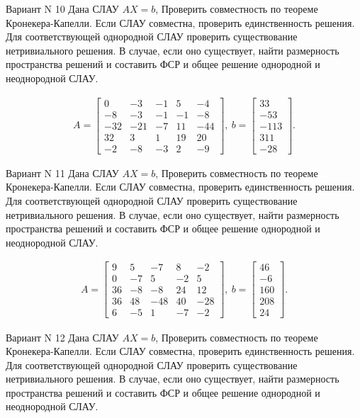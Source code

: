\documentclass[11pt]{report}
\begin{document}
Вариант N 10
Дана СЛАУ $AX = b$,
Проверить совместность по теореме Кронекера-Капелли. Если СЛАУ совместна, проверить единственность решения.
Для соответствующей однородной СЛАУ проверить существование нетривиального решения. В случае, если оно существует,
найти размерность пространства решений и составить ФСР и общее решение однородной  и неоднородной СЛАУ.


\begin{align*}
 A = \left[\begin{matrix}0 & -3 & -1 & 5 & -4\\-8 & -3 & -1 & -1 & -8\\-32 & -21 & -7 & 11 & -44\\32 & 3 & 1 & 19 & 20\\-2 & -8 & -3 & 2 & -9\end{matrix}\right],
\ b = \left[\begin{matrix}33\\-53\\-113\\311\\-28\end{matrix}\right]. 
 \end{align*}

Вариант N 11
Дана СЛАУ $AX = b$,
Проверить совместность по теореме Кронекера-Капелли. Если СЛАУ совместна, проверить единственность решения.
Для соответствующей однородной СЛАУ проверить существование нетривиального решения. В случае, если оно существует,
найти размерность пространства решений и составить ФСР и общее решение однородной  и неоднородной СЛАУ.


\begin{align*}
 A = \left[\begin{matrix}9 & 5 & -7 & 8 & -2\\0 & -7 & 5 & -2 & 5\\36 & -8 & -8 & 24 & 12\\36 & 48 & -48 & 40 & -28\\6 & -5 & 1 & -7 & -2\end{matrix}\right],
\ b = \left[\begin{matrix}46\\-6\\160\\208\\24\end{matrix}\right]. 
 \end{align*}

Вариант N 12
Дана СЛАУ $AX = b$,
Проверить совместность по теореме Кронекера-Капелли. Если СЛАУ совместна, проверить единственность решения.
Для соответствующей однородной СЛАУ проверить существование нетривиального решения. В случае, если оно существует,
найти размерность пространства решений и составить ФСР и общее решение однородной  и неоднородной СЛАУ.
\end{document}

